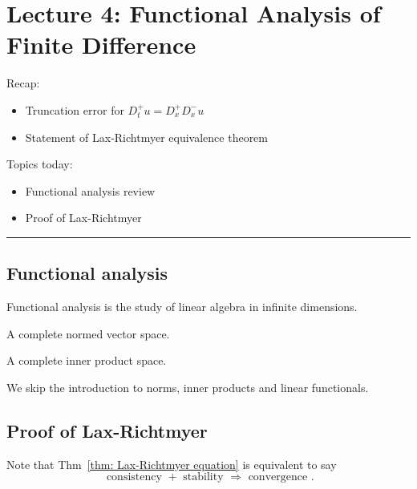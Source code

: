 \newpage 
\section{Lecture 4: Functional Analysis of Finite Difference}
Recap: 
\begin{itemize}
    \item Truncation error for $D_t^{+} u=D_x^{+} D_x^{-} u$
    \item Statement of Lax-Richtmyer equivalence theorem 
\end{itemize}
Topics today: 
\begin{itemize}
    \item Functional analysis review 
    \item Proof of Lax-Richtmyer 
\end{itemize}

\vspace{1em}
\hrule 
\vspace{1em} 

\subsection{Functional analysis} 
Functional analysis is the study of linear algebra in infinite dimensions.  

\begin{definition}
\label{def: Banach space}
A complete normed vector space.
\end{definition}

\begin{definition}
\label{def: Hilbert space}
A complete inner product space.
\end{definition}
We skip the introduction to norms, inner products and linear functionals. 

\subsection{Proof of Lax-Richtmyer}

Note that Thm~\ref{thm: Lax-Richtmyer equation} is equivalent to say 
\[
    \text{ consistency } + \text{ stability } \Rightarrow \text{ convergence }. 
\]

